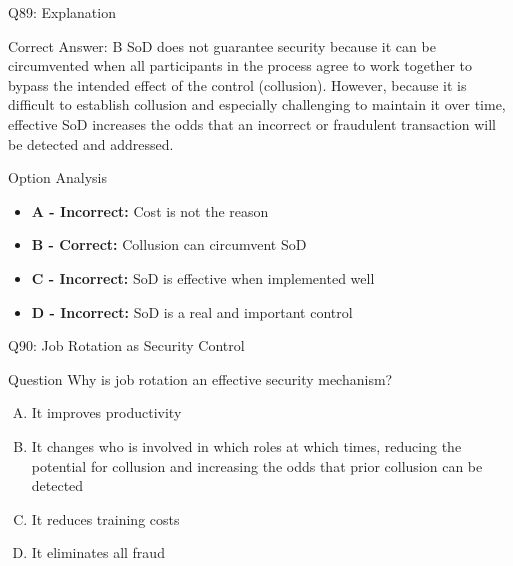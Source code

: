 \documentclass{beamer}
\begin{document}
	\begin{frame}{Q89: Explanation}
		\begin{block}{Correct Answer: B}
			SoD does not guarantee security because it can be circumvented when all participants in the process agree to work together to bypass the intended effect of the control (collusion). However, because it is difficult to establish collusion and especially challenging to maintain it over time, effective SoD increases the odds that an incorrect or fraudulent transaction will be detected and addressed.
		\end{block}
		\begin{block}{Option Analysis}
			\begin{itemize}
				\item \textbf{A - Incorrect:} Cost is not the reason
				\item \textbf{B - Correct:} Collusion can circumvent SoD
				\item \textbf{C - Incorrect:} SoD is effective when implemented well
				\item \textbf{D - Incorrect:} SoD is a real and important control
			\end{itemize}
		\end{block}
	\end{frame}
	
	\begin{frame}{Q90: Job Rotation as Security Control}
		\begin{block}{Question}
			Why is job rotation an effective security mechanism?
		\end{block}
		\begin{enumerate}[(A)]
			\item It improves productivity
			\item It changes who is involved in which roles at which times, reducing the potential for collusion and increasing the odds that prior collusion can be detected
			\item It reduces training costs
			\item It eliminates all fraud
		\end{enumerate}
	\end{frame}
	
\end{document}
